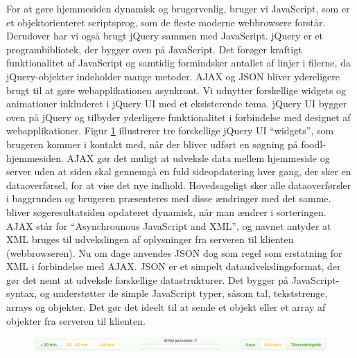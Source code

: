 For at gøre hjemmesiden dynamisk og brugervenlig, bruger vi JavaScript\cite{javascriptwiki}, som er et objektorienteret scriptsprog, som de fleste moderne webbrowsere forstår. Derudover har vi også brugt jQuery\cite{jquery} sammen med JavaScript. jQuery er et programbibliotek, der bygger oven på JavaScript. Det forøger kraftigt funktionalitet af JavaScript og samtidig formindsker antallet af linjer i filerne, da jQuery-objekter indeholder mange metoder. AJAX\cite{ajaxwiki} og JSON\cite{jsonwiki} bliver ydereligere brugt til at gøre webapplikationen asynkront. Vi udnytter forskellige widgets og animationer inkluderet i jQuery UI\cite{jqueryuiwiki} med et eksisterende tema. jQuery UI bygger oven på jQuery og tilbyder yderligere funktionalitet i forbindelse med designet af webapplikationer. Figur \ref{fig:toolbar} illustrerer tre forskellige jQuery UI ``widgets'', som brugeren kommer i kontakt med, når der bliver udført en søgning på foodl-hjemmesiden. AJAX gør det muligt at udveksle data mellem hjemmeside og server uden at siden skal gennemgå en fuld sideopdatering hver gang, der sker en dataoverførsel, for at vise det nye indhold. Hovedsageligt sker alle dataoverførsler i baggrunden og brugeren præsenteres med disse ændringer med det samme. \Fx bliver søgeresultatsiden opdateret dynamisk, når man ændrer i sorteringen. AJAX står for ``Asynchrounous JavaScript and XML'', og navnet antyder at XML bruges til udvekslingen af oplysninger fra serveren til klienten (webbrowseren). Nu om dage anvendes JSON dog som regel som erstatning for XML i forbindelse med AJAX. JSON er et simpelt dataudvekslingsformat, der gør det nemt at udveksle forskellige datastrukturer. Det bygger på JavaScript-syntax, og understøtter de simple JavaScript typer, såsom tal, tekststrenge, arrays og objekter. Det gør det ideelt til \fx at sende et objekt eller et array af objekter fra serveren til klienten.

\begin{figure}[H]
\centering
\includegraphics[scale=0.6]{billeder/jqueryuieksempel.png}
\label{fig:toolbar}
\end{figure}

